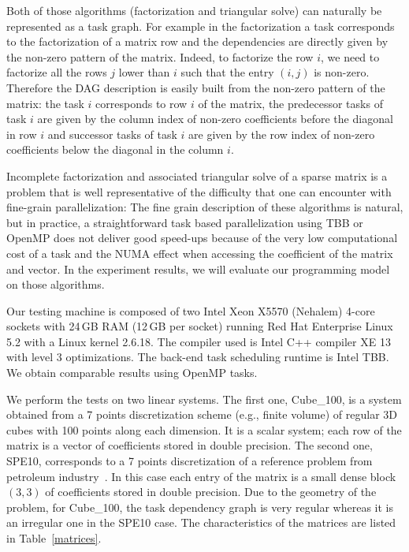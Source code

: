 Both of those algorithms (factorization and triangular solve) can naturally be represented as a task graph. For example in the factorization 
a task corresponds to the factorization of a matrix row and the dependencies are directly given by the non-zero pattern of the matrix.
Indeed, to factorize the row $i$, we need to factorize all the rows $j$ lower than $i$ 
such that the entry $(i,j)$ is non-zero.
Therefore the DAG description is easily built from the non-zero pattern of the matrix:
the task $i$ corresponds to row $i$ of the matrix, the predecessor tasks of task $i$ are given by the column index of non-zero coefficients before the diagonal in row $i$
 and successor tasks of task $i$ are given by the row index of non-zero coefficients below the diagonal in the column $i$.

Incomplete factorization and associated triangular solve of a sparse matrix
is a problem that is well representative of the difficulty that one can encounter
with fine-grain parallelization: The fine grain description of these algorithms
is natural, but in practice, a straightforward task based parallelization using TBB or
OpenMP does not deliver good speed-ups because of the very low computational cost of
a task and the NUMA effect when accessing the coefficient of the matrix and vector.
In the experiment results, we will evaluate our programming model on those algorithms.

Our testing machine is composed of two Intel Xeon X5570 (Nehalem)
4-core sockets with 24\,GB RAM (12\,GB per socket) running Red Hat Enterprise Linux 5.2
with a Linux kernel 2.6.18.
The compiler used is Intel C++ compiler XE 13 with level 3
optimizations. The back-end task scheduling runtime is Intel TBB. We obtain comparable
results using OpenMP tasks.

We perform the tests on two linear systems. The first one, Cube\_100, is a
system obtained from a 7 points discretization scheme (e.g., finite volume) of regular 
3D cubes with 100 points along each dimension. 
It is a scalar system; each row of the matrix is a vector of coefficients stored in double precision. 
The second one, SPE10, corresponds to a 7 points discretization of a reference problem from petroleum industry~\cite{spe10}. 
In this case each entry of the matrix is a small dense block $(3,3)$ of coefficients stored in double precision.
Due to the geometry of the problem, for Cube\_100, the task dependency graph is very regular whereas it is an irregular one in the SPE10 case.
The characteristics of the matrices are listed in Table~\ref{matrices}.

